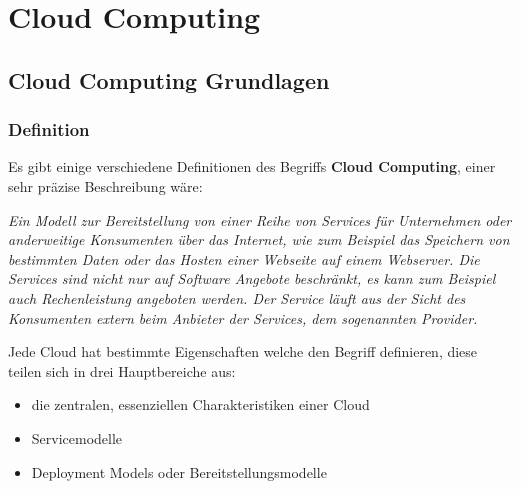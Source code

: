 \chapter{Cloud Computing}
\putz


\section{Cloud Computing Grundlagen}
\subsection{Definition}
Es gibt einige verschiedene Definitionen des Begriffs \textbf{Cloud Computing}, einer sehr präzise Beschreibung wäre:

\begin{center}
   \textit{Ein Modell zur Bereitstellung von einer Reihe von Services für Unternehmen oder anderweitige Konsumenten über das Internet, wie zum Beispiel das
	Speichern von bestimmten Daten oder das Hosten einer Webseite auf einem Webserver. Die Services sind nicht nur auf Software Angebote beschränkt, es kann zum Beispiel auch Rechenleistung
	angeboten werden. Der Service läuft aus der Sicht des Konsumenten extern beim Anbieter der Services, dem sogenannten Provider.}
\end{center}

Jede Cloud hat bestimmte Eigenschaften welche den Begriff definieren, diese teilen sich in drei Hauptbereiche aus:
\begin{itemize}
	\item die zentralen, essenziellen Charakteristiken einer Cloud
	\item Servicemodelle
	\item Deployment Models oder Bereitstellungsmodelle
\end{itemize}


